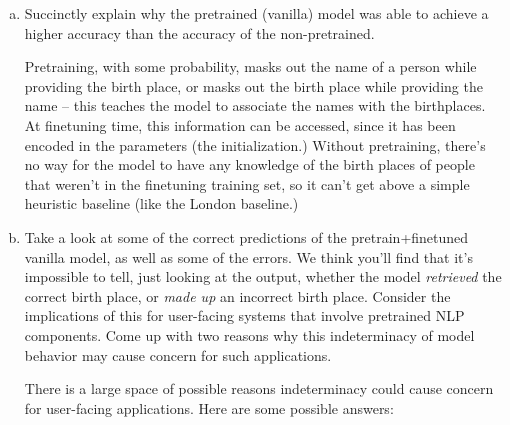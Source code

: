 \begin{enumerate}[(a)]

\item
Succinctly explain why the pretrained (vanilla) model was able to achieve a higher accuracy than the accuracy of the non-pretrained.

\begin{answer}
Pretraining, with some probability, masks out the name of a person while providing the birth place, or masks out the birth place while providing the name -- this teaches the model to associate the names with the birthplaces.
At finetuning time, this information can be accessed, since it has been encoded in the parameters (the initialization.)
Without pretraining, there's no way for the model to have any knowledge of the birth places of people that weren't in the finetuning training set, so it can't get above a simple heuristic baseline (like the London baseline.)
\end{answer}

\item
Take a look at some of the correct predictions of the pretrain+finetuned vanilla model, as well as some of the errors.
We think you'll find that it's impossible to tell, just looking at the output, whether the model \textit{retrieved} the correct birth place, or \textit{made up} an incorrect birth place.
Consider the implications of this for user-facing systems that involve pretrained NLP components.
Come up with two reasons why this indeterminacy of model behavior may cause concern for such applications.

\begin{answer}
There is a large space of possible reasons indeterminacy could cause concern for user-facing applications. 
Here are some possible answers:


\end{answer}
\end{enumerate}
